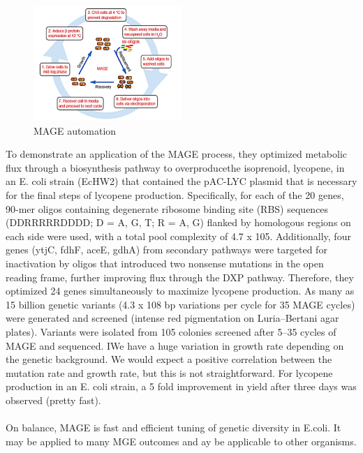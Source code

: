 \begin{figure}
\includegraphics[width=0.5\textwidth, center ]{mage}
\caption{\label{fig:mage} MAGE automation}
\end{figure}
\noindent
To demonstrate an application of the MAGE process, they optimized metabolic flux through a biosynthesis pathway to overproducethe isoprenoid, lycopene, in an E. coli strain (EcHW2) that contained the pAC-LYC plasmid that is necessary for the final steps of lycopene production.
Specifically, for each of the 20 genes, 90-mer oligos containing degenerate ribosome binding site (RBS) sequences (DDRRRRRDDDD; D = A, G, T; R = A, G) flanked by homologous regions on each side were used, with a total pool complexity of 4.7 x 105.
Additionally, four genes (ytjC, fdhF, aceE, gdhA) from secondary pathways were targeted for inactivation by oligos that introduced
two nonsense mutations in the open reading frame, further improving flux through the DXP pathway.
Therefore, they optimized 24 genes simultaneously to maximize lycopene production.
As many as 15 billion genetic variants (4.3 x 108 bp variations per cycle for 35 MAGE cycles) were generated and screened (intense red pigmentation on Luria–Bertani agar plates).
Variants were isolated from 105 colonies screened after 5–35 cycles of MAGE and sequenced.
IWe have a huge variation in growth rate depending on the genetic background. We would expect a positive correlation between the mutation rate and growth rate,  but this is not straightforward.
For lycopene production in an E. coli strain, a 5 fold improvement in yield after three days was observed (pretty fast).
\\
\\
\noindent
On balance, MAGE is fast and efficient tuning of genetic diversity in E.coli. 
It may be applied to many MGE outcomes and ay be applicable to other organisms.

